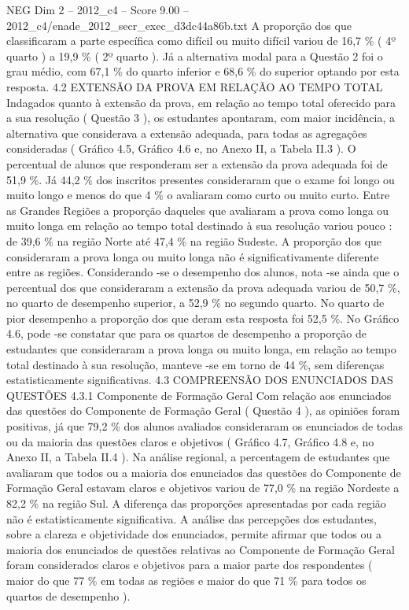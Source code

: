 \begin{textsample}{NEG Dim 2 – 2012\_c4 – Score 9.00 – 2012\_c4/enade\_2012\_secr\_exec\_d3dc44a86b.txt}
A proporção dos que classificaram a parte específica como difícil ou muito difícil variou de 16,7 \% ( 4º quarto ) a 19,9 \% ( 2º quarto ).
Já a alternativa modal para a Questão 2 foi o grau médio, com 67,1 \% do quarto inferior e 68,6 \% do superior optando por esta resposta. 4.2 EXTENSÃO DA PROVA EM RELAÇÃO AO TEMPO TOTAL Indagados quanto à extensão da prova, em relação ao tempo total oferecido para a sua resolução ( Questão 3 ), os estudantes apontaram, com maior incidência, a alternativa que considerava a extensão adequada, para todas as agregações consideradas ( Gráfico 4.5, Gráfico 4.6 e, no Anexo II, a Tabela II.3 ).
O percentual de alunos que responderam ser a extensão da prova adequada foi de 51,9 \%.
Já 44,2 \% dos inscritos presentes consideraram que o exame foi longo ou muito longo e menos do que 4 \% o avaliaram como curto ou muito curto.
Entre as Grandes Regiões a proporção daqueles que avaliaram a prova como longa ou muito longa em relação ao tempo total destinado à sua resolução variou pouco : de 39,6 \% na região Norte até 47,4 \% na região Sudeste.
A proporção dos que consideraram a prova longa ou muito longa não é significativamente diferente entre as regiões.
Considerando -se o desempenho dos alunos, nota -se ainda que o percentual dos que consideraram a extensão da prova adequada variou de 50,7 \%, no quarto de desempenho superior, a 52,9 \% no segundo quarto.
No quarto de pior desempenho a proporção dos que deram esta resposta foi 52,5 \%.
No Gráfico 4.6, pode -se constatar que para os quartos de desempenho a proporção de estudantes que consideraram a prova longa ou muito longa, em relação ao tempo total destinado à sua resolução, manteve -se em torno de 44 \%, sem diferenças estatisticamente significativas. 4.3 COMPREENSÃO DOS ENUNCIADOS DAS QUESTÕES 4.3.1 Componente de Formação Geral Com relação aos enunciados das questões do Componente de Formação Geral ( Questão 4 ), as opiniões foram positivas, já que 79,2 \% dos alunos avaliados consideraram os enunciados de todas ou da maioria das questões claros e objetivos ( Gráfico 4.7, Gráfico 4.8 e, no Anexo II, a Tabela II.4 ).
Na análise regional, a percentagem de estudantes que avaliaram que todos ou a maioria dos enunciados das questões do Componente de Formação Geral estavam claros e objetivos variou de 77,0 \% na região Nordeste a 82,2 \% na região Sul.
A diferença das proporções apresentadas por cada região não é estatisticamente significativa.
A análise das percepções dos estudantes, sobre a clareza e objetividade dos enunciados, permite afirmar que todos ou a maioria dos enunciados de questões relativas ao Componente de Formação Geral foram considerados claros e objetivos para a maior parte dos respondentes ( maior do que 77 \% em todas as regiões e maior do que 71 \% para todos os quartos de desempenho ).

\end{textsample}
